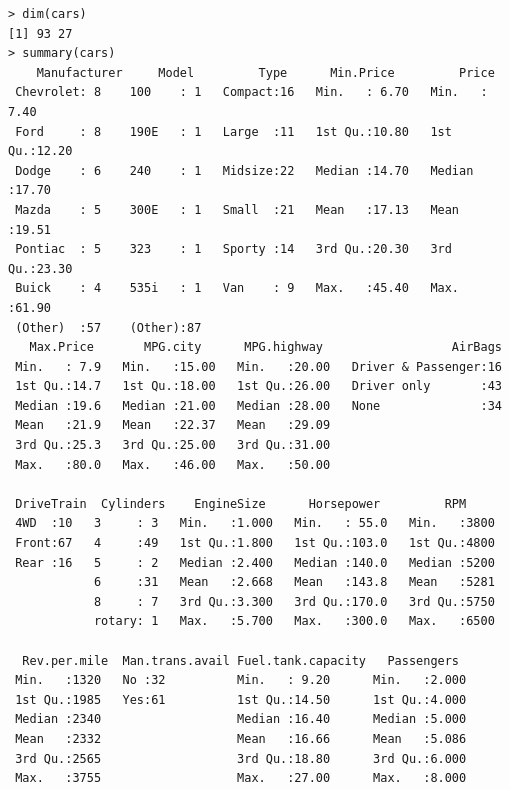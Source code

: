 \documentclass[12pt]{article}
\begin{document}
\lstset{basicstyle=\scriptsize}
\begin{lstlisting}
> dim(cars)
[1] 93 27
> summary(cars)
    Manufacturer     Model         Type      Min.Price         Price      
 Chevrolet: 8    100    : 1   Compact:16   Min.   : 6.70   Min.   : 7.40  
 Ford     : 8    190E   : 1   Large  :11   1st Qu.:10.80   1st Qu.:12.20  
 Dodge    : 6    240    : 1   Midsize:22   Median :14.70   Median :17.70  
 Mazda    : 5    300E   : 1   Small  :21   Mean   :17.13   Mean   :19.51  
 Pontiac  : 5    323    : 1   Sporty :14   3rd Qu.:20.30   3rd Qu.:23.30  
 Buick    : 4    535i   : 1   Van    : 9   Max.   :45.40   Max.   :61.90  
 (Other)  :57    (Other):87                                               
   Max.Price       MPG.city      MPG.highway                  AirBags  
 Min.   : 7.9   Min.   :15.00   Min.   :20.00   Driver & Passenger:16  
 1st Qu.:14.7   1st Qu.:18.00   1st Qu.:26.00   Driver only       :43  
 Median :19.6   Median :21.00   Median :28.00   None              :34  
 Mean   :21.9   Mean   :22.37   Mean   :29.09                          
 3rd Qu.:25.3   3rd Qu.:25.00   3rd Qu.:31.00                          
 Max.   :80.0   Max.   :46.00   Max.   :50.00                          
                                                                       
 DriveTrain  Cylinders    EngineSize      Horsepower         RPM      
 4WD  :10   3     : 3   Min.   :1.000   Min.   : 55.0   Min.   :3800  
 Front:67   4     :49   1st Qu.:1.800   1st Qu.:103.0   1st Qu.:4800  
 Rear :16   5     : 2   Median :2.400   Median :140.0   Median :5200  
            6     :31   Mean   :2.668   Mean   :143.8   Mean   :5281  
            8     : 7   3rd Qu.:3.300   3rd Qu.:170.0   3rd Qu.:5750  
            rotary: 1   Max.   :5.700   Max.   :300.0   Max.   :6500  
                                                                      
  Rev.per.mile  Man.trans.avail Fuel.tank.capacity   Passengers   
 Min.   :1320   No :32          Min.   : 9.20      Min.   :2.000  
 1st Qu.:1985   Yes:61          1st Qu.:14.50      1st Qu.:4.000  
 Median :2340                   Median :16.40      Median :5.000  
 Mean   :2332                   Mean   :16.66      Mean   :5.086  
 3rd Qu.:2565                   3rd Qu.:18.80      3rd Qu.:6.000  
 Max.   :3755                   Max.   :27.00      Max.   :8.000  
                                                                  

\end{lstlisting}
\end{document}
